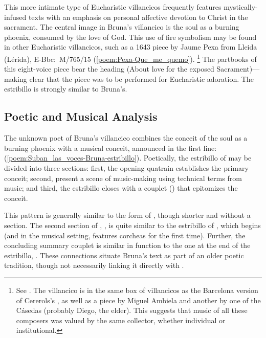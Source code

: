 This more intimate type of Eucharistic villancicos frequently features mystically-infused texts with an emphasis on personal affective devotion to Christ in the sacrament.
The central image in Bruna's villancico is the soul as a burning phoenix, consumed by the love of God.
This use of fire symbolism may be found in other Eucharistic villancicos, such as a 1643 piece by Jaume Pexa from Lleida (Lérida), E-Bbc:~M/765/15 (\cref{poem:Pexa-Que_me_quemo}).%
	\footnote{%
See .
The villancico is in the same box of villancicos as the Barcelona version of Cererols's , as well as a piece by Miguel Ambiela and another by one of the Cásedas (probably Diego, the elder).
This suggests that music of all these composers was valued by the same collector, whether individual or institutional.
	}
The partbooks of this eight-voice piece bear the heading  (About love for the exposed Sacrament)---making clear that the piece was to be performed for Eucharistic adoration.
The estribillo is strongly similar to Bruna's.
	
% 


\subsection{%
Poetic and Musical Analysis
}

The unknown poet of Bruna's villancico combines the conceit of the soul as a burning phoenix with a musical conceit, announced in the first line:  (\cref{poem:Suban_las_voces-Bruna-estribillo}).
Poetically, the estribillo of  may be divided into three sections: first, the opening quatrain establishes the primary conceit; second,  present a scene of music-making using technical terms from music; and third, the estribillo closes with a couplet () that epitomizes the conceit.

This pattern is generally similar to the form of , though shorter and without a  section.
The second section of , , is quite similar to the estribillo of , which begins  (and in the musical setting, features corcheas for the first time).
Further, the concluding summary couplet is similar in function to the one at the end of the  estribillo, .
These connections situate Bruna's text as part of an older poetic tradition, though not necessarily linking it directly with .

